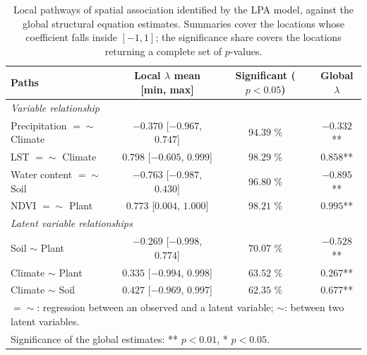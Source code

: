 \begin{table}[!ht]
\centering
\caption{Local pathways of spatial association identified by the LPA model, against the global structural equation estimates. Summaries cover the locations whose coefficient falls inside $[-1, 1]$; the significance share covers the locations returning a complete set of $p$-values.}
\label{tab:lpa-validation}
\begin{tabular}{lccc}
\hline
Paths & Local $\lambda$ mean [min, max] & Significant ($p<0.05$) & Global $\lambda$ \\
\hline
\multicolumn{4}{l}{\textit{Variable relationship}} \\
Precipitation $=\sim$ Climate & $-0.370$ [$-0.967$, $0.747$] & $94.39$ \% & $-0.332$** \\
LST $=\sim$ Climate & $0.798$ [$-0.605$, $0.999$] & $98.29$ \% & $0.858$** \\
Water content $=\sim$ Soil & $-0.763$ [$-0.987$, $0.430$] & $96.80$ \% & $-0.895$** \\
NDVI $=\sim$ Plant & $0.773$ [$0.004$, $1.000$] & $98.21$ \% & $0.995$** \\
\multicolumn{4}{l}{\textit{Latent variable relationships}} \\
Soil $\sim$ Plant & $-0.269$ [$-0.998$, $0.774$] & $70.07$ \% & $-0.528$** \\
Climate $\sim$ Plant & $0.335$ [$-0.994$, $0.998$] & $63.52$ \% & $0.267$** \\
Climate $\sim$ Soil & $0.427$ [$-0.969$, $0.997$] & $62.35$ \% & $0.677$** \\
\hline
\multicolumn{4}{l}{\footnotesize $=\sim$: regression between an observed and a latent variable; $\sim$: between two latent variables.} \\
\multicolumn{4}{l}{\footnotesize Significance of the global estimates: ** $p<0.01$, * $p<0.05$.} \\
\end{tabular}
\end{table}
